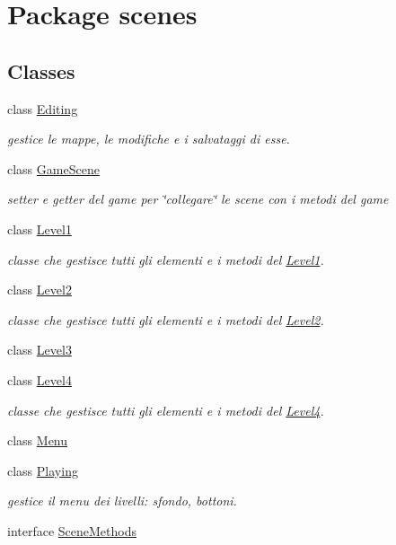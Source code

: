 \hypertarget{namespacescenes}{}\section{Package scenes}
\label{namespacescenes}
\subsection*{Classes}
\begin{DoxyCompactItemize}
\item 
class \hyperlink{classscenes_1_1_editing}{Editing}
\begin{DoxyCompactList}\small\item\em gestice le mappe, le modifiche e i salvataggi di esse. \end{DoxyCompactList}\item 
class \hyperlink{classscenes_1_1_game_scene}{Game\+Scene}
\begin{DoxyCompactList}\small\item\em setter e getter del game per \char`\"{}collegare\char`\"{} le scene con i metodi del game \end{DoxyCompactList}\item 
class \hyperlink{classscenes_1_1_level1}{Level1}
\begin{DoxyCompactList}\small\item\em classe che gestisce tutti gli elementi e i metodi del \hyperlink{classscenes_1_1_level1}{Level1}. \end{DoxyCompactList}\item 
class \hyperlink{classscenes_1_1_level2}{Level2}
\begin{DoxyCompactList}\small\item\em classe che gestisce tutti gli elementi e i metodi del \hyperlink{classscenes_1_1_level2}{Level2}. \end{DoxyCompactList}\item 
class \hyperlink{classscenes_1_1_level3}{Level3}
\item 
class \hyperlink{classscenes_1_1_level4}{Level4}
\begin{DoxyCompactList}\small\item\em classe che gestisce tutti gli elementi e i metodi del \hyperlink{classscenes_1_1_level4}{Level4}. \end{DoxyCompactList}\item 
class \hyperlink{classscenes_1_1_menu}{Menu}
\item 
class \hyperlink{classscenes_1_1_playing}{Playing}
\begin{DoxyCompactList}\small\item\em gestice il menu dei livelli\+: sfondo, bottoni. \end{DoxyCompactList}\item 
interface \hyperlink{interfacescenes_1_1_scene_methods}{Scene\+Methods}
\end{DoxyCompactItemize}
